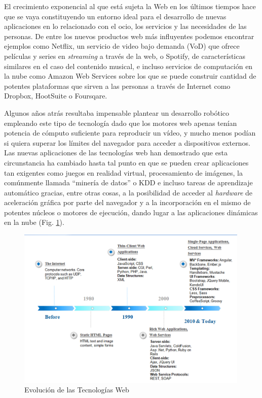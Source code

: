 El crecimiento exponencial al que está sujeta la Web en los últimos tiempos hace que se vaya constituyendo un entorno ideal para el desarrollo de nuevas aplicaciones en lo relacionado con el ocio, los servicios y las necesidades de las personas. De entre los nuevos productos web más influyentes podemos encontrar ejemplos como Netflix, un servicio de video bajo demanda (VoD) que ofrece películas y series en \textit{streaming} a través de la web, o Spotify, de características similares en el caso del contenido musical, e incluso servicios de computación en la nube como Amazon Web Services sobre los que se puede construir cantidad de potentes plataformas que sirven a las personas a través de Internet como Dropbox, HootSuite o Foursqare.

Algunos años atrás resultaba impensable plantear un desarrollo robótico empleando este tipo de tecnología dado que los motores web apenas tenían potencia de cómputo suficiente para reproducir un vídeo, y mucho menos podían si quiera superar los límites del navegador para acceder a dispositivos externos. Las nuevas aplicaciones de las tecnologías web han demostrado que esta circunstancia ha cambiado hasta tal punto en que se pueden crear aplicaciones tan exigentes como juegos en realidad virtual, procesamiento de imágenes, la comúnmente llamada ``minería de datos'' o KDD e incluso tareas de aprendizaje automático gracias, entre otras cosas, a la posibilidad de acceder al \textit{hardware} de aceleración gráfica por parte del navegador y a la incorporación en el mismo de potentes núcleos o motores de ejecución, dando lugar a las aplicaciones dinámicas en la nube (Fig. \ref{web}).

\begin{figure}[!hbtp]  \centering\noindent
    \includegraphics[width=0.99\textwidth]{figures/web-history.png}
    \caption{Evolución de las Tecnologías Web}
    \label{web}
\end{figure}

